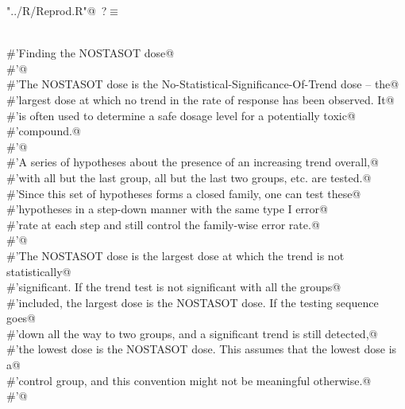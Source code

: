 \documentclass[reqno]{amsart}
\renewcommand{\NWtarget}[2]{\hypertarget{#1}{#2}}
\begin{document}
\begin{flushleft} \small\label{scrap42}\raggedright\small
\NWtarget{nuweb?}{} \verb@"../R/Reprod.R"@\nobreak\ {\footnotesize {?}}$\equiv$
\vspace{-1ex}
\begin{list}{}{} \item
\mbox{}\verb@@\\
\mbox{}\verb@#'Finding the NOSTASOT dose@\\
\mbox{}\verb@#'@\\
\mbox{}\verb@#'The NOSTASOT dose is the No-Statistical-Significance-Of-Trend dose -- the@\\
\mbox{}\verb@#'largest dose at which no trend in the rate of response has been observed. It@\\
\mbox{}\verb@#'is often used to determine a safe dosage level for a potentially toxic@\\
\mbox{}\verb@#'compound.@\\
\mbox{}\verb@#'@\\
\mbox{}\verb@#'A series of hypotheses about the presence of an increasing trend overall,@\\
\mbox{}\verb@#'with all but the last group, all but the last two groups, etc.  are tested.@\\
\mbox{}\verb@#'Since this set of hypotheses forms a closed family, one can test these@\\
\mbox{}\verb@#'hypotheses in a step-down manner with the same  type I error@\\
\mbox{}\verb@#'rate at each step and still control the family-wise error rate.@\\
\mbox{}\verb@#'@\\
\mbox{}\verb@#'The NOSTASOT dose is the largest dose at which the trend is not statistically@\\
\mbox{}\verb@#'significant. If the trend test is not significant with all the groups@\\
\mbox{}\verb@#'included, the largest dose is the NOSTASOT dose. If the testing sequence goes@\\
\mbox{}\verb@#'down all the way to two groups, and a significant trend is still detected,@\\
\mbox{}\verb@#'the lowest dose is the NOSTASOT dose. This assumes that the lowest dose is a@\\
\mbox{}\verb@#'control group, and this convention might not be meaningful otherwise.@\\
\mbox{}\verb@#'@\\

\end{list}
\end{flushleft}
\end{document}
